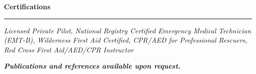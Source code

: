 \documentclass[10pt]{article}
\begin{document}
\vspace*{0.25 mm}
\textbf{Certifications}
\smallskip
\hrule 

\emph{Licensed Private Pilot, National Registry Certified Emergency Medical Technician (EMT-B), Wilderness First Aid Certified, CPR/AED for Professional Rescuers, Red Cross First Aid/AED/CPR Instructor}%

\smallskip
\emph{\textbf{Publications and references available upon request.}}
\end{document}
